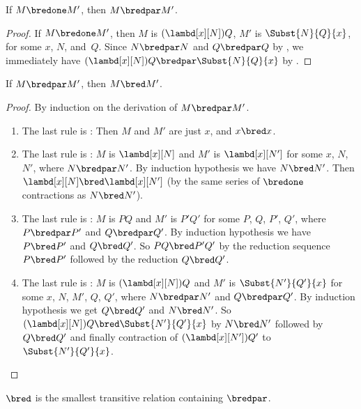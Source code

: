 \documentclass[../../../include/open-logic-section]{subfiles}
\begin{document}

\begin{lem}
  If $M \bredone M'$, then $M \bredpar M'$.
\end{lem}
\begin{proof} If $M \bredone M'$, then $M$ is
    $(\lambd[x][N])Q$, $M'$ is $\Subst{N}{Q}{x}$, for some
    $x$, $N$, and~$Q$. Since $N \bredpar N$ and $Q \bredpar Q$ by
    , we immediately have $(\lambd[x][N])Q
    \bredpar \Subst{N}{Q}{x}$ by .
\end{proof}

\begin{lem}
  If $M \bredpar M'$, then $M \bred M'$.
\end{lem}

\begin{proof} By induction on the derivation of $M \bredpar M'$.
  \begin{enumerate}
  \item The last rule is : Then $M$ and $M'$
    are just $x$, and $x \bred x$.
  \item The last rule is : $M$ is 
    $\lambd[x][N]$ and $M'$ is $\lambd[x][N']$ for some $x$, $N$, $N'$, where
    $N \bredpar N'$. By induction hypothesis we have $N \bred N'$. Then
    $\lambd[x][N] \bred \lambd[x][N']$ (by the same series of
    $\bredone$ contractions as $N \bred N'$).
  \item The last rule is : $M$ is 
    $PQ$ and $M'$ is $P'Q'$ for some $P$, $Q$, $P'$, $Q'$, where $P \bredpar P'$
    and $Q \bredpar Q'$. By induction hypothesis we have $P \bred P'$ and $Q \bred
    Q'$.  So $PQ \bred P'Q'$ by the reduction sequence $P \bred P'$ followed
    by the reduction $Q \bred Q'$.
  \item The last rule is : $M$ is
    $(\lambd[x][N])Q$ and $M'$ is  $\Subst{N'}{Q'}{x}$ for some $x$,
    $N$, $M'$, $Q$, $Q'$, where $N \bredpar N'$ and $Q \bredpar Q'$.
    By induction hypothesis we get $Q \bred Q'$ and $N \bred N'$. So
    $(\lambd[x][N])Q \bred \Subst{N'}{Q'}{x}$ by $N \bred N'$ followed
    by $Q \bred Q'$ and finally contraction of $(\lambd[x][N'])Q'$ to
    $\Subst{N'}{Q'}{x}$.
  \end{enumerate}
\end{proof}

\begin{lem}
  $\bred$ is the smallest transitive relation containing $\bredpar$.
\end{lem}
\end{document}

